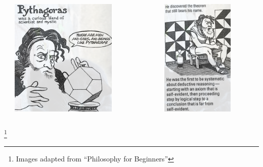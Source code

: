 \documentclass[unicode, 14pt, aspectratio=169]{beamer}
\newcommand\blfootnote[1]{%
  \begingroup
  \renewcommand\thefootnote{}\footnote{#1}%
  \addtocounter{footnote}{-1}%
  \endgroup
}
\begin{document}
\begin{frame}
\begin{columns}
\begin{column}{0.25\textwidth}
\begin{center}
    \end{center}
  \end{column}
  \begin{column}{0.25\textwidth}
    \begin{center}
      \includegraphics[width=0.7\textwidth]{images/pythagoras.png}
    \end{center}
  \end{column}
  \begin{column}{0.25\textwidth}
    \begin{center}
      \includegraphics[width=0.7\textwidth]{images/pythagoras2.png}
    \end{center}
  \end{column}  
\end{columns}
\blfootnote{Images adapted from ``Philosophy for Beginners''\supercite{philosophy-for-begginers}}
\end{frame}
\end{document}
